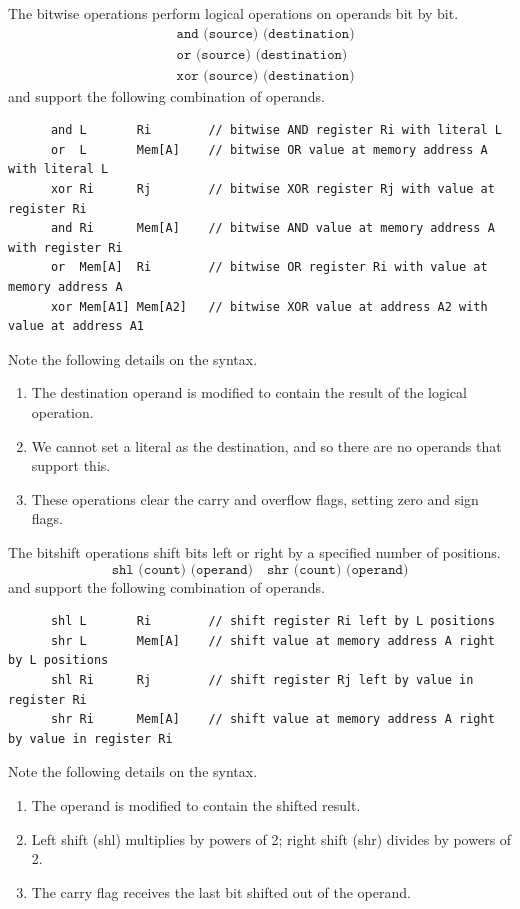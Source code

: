   \begin{definition}
    \label{def:bitwise-operations}
    The bitwise operations perform logical operations on operands bit by bit.
    \begin{align*}
      & \texttt{and (source) (destination)} \\ 
      & \texttt{or (source) (destination)} \\
      & \texttt{xor (source) (destination)}
    \end{align*}
    and support the following combination of operands.
    \begin{lstlisting}
      and L       Ri        // bitwise AND register Ri with literal L
      or  L       Mem[A]    // bitwise OR value at memory address A with literal L
      xor Ri      Rj        // bitwise XOR register Rj with value at register Ri
      and Ri      Mem[A]    // bitwise AND value at memory address A with register Ri
      or  Mem[A]  Ri        // bitwise OR register Ri with value at memory address A
      xor Mem[A1] Mem[A2]   // bitwise XOR value at address A2 with value at address A1
    \end{lstlisting}
    Note the following details on the syntax.
    \begin{enumerate}
      \item The destination operand is modified to contain the result of the logical operation.
      \item We cannot set a literal as the destination, and so there are no operands that support this.
      \item These operations clear the carry and overflow flags, setting zero and sign flags.
    \end{enumerate}
  \end{definition}

  \begin{definition}[Bitshift]
    \label{def:bitshift}
    The bitshift operations shift bits left or right by a specified number of positions.
    \begin{equation}
      \texttt{shl (count) (operand)} \quad \texttt{shr (count) (operand)}
    \end{equation}
    and support the following combination of operands.
    \begin{lstlisting}
      shl L       Ri        // shift register Ri left by L positions
      shr L       Mem[A]    // shift value at memory address A right by L positions
      shl Ri      Rj        // shift register Rj left by value in register Ri
      shr Ri      Mem[A]    // shift value at memory address A right by value in register Ri
    \end{lstlisting}
    Note the following details on the syntax.
    \begin{enumerate}
      \item The operand is modified to contain the shifted result.
      \item Left shift (shl) multiplies by powers of 2; right shift (shr) divides by powers of 2.
      \item The carry flag receives the last bit shifted out of the operand.
    \end{enumerate}
  \end{definition}

